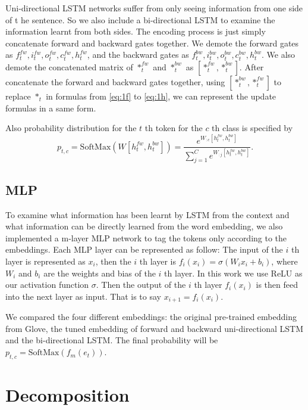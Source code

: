 \documentclass{article}
\begin{document}
Uni-directional LSTM networks suffer from only seeing information from one side of t he sentence. So we also include a bi-directional LSTM to examine the information learnt from both sides. The encoding process is just simply concatenate forward and backward gates together. We demote the forward gates as $f_t^{fw}, i_t^{fw}, o_t^{fw}, c_t^{fw}, h_t^{fw}$, and the backward gates as $f_t^{bw}, i_t^{bw}, o_t^{bw}, c_t^{bw}, h_t^{bw}$. We also demote the concatenated matrix of $*_t^{fw}$ and $*_t^{bw}$ as $[*_t^{fw}, *_t^{bw}]$. After concatenate the forward and backward gates together, using $[*_t^{bw}, *_t^{fw}]$ to replace $*_t$ in formulas from \ref{eq:1f} to \ref{eq:1h}, we can represent the update formulas in a same form. 

Also probability distribution for the $t$ th token for the $c$ th class is specified by 
\begin{equation}
p_{t, c} = \text{SoftMax}(W [h_t^{fw}, h_t^{bw}]) = \frac{e^{W_{:c} [h_t^{fw}, h_t^{bw}]}}{\sum_{j = 1} ^ C e^{W_{:j} [h_t^{fw}, h_t^{bw}]}}.
\end{equation}


\subsection{MLP}

To examine what information has been learnt by LSTM from the context and what information can be directly learned from the word embedding, we also implemented a m-layer MLP network to tag the tokens only according to the embeddings. Each MLP layer can be represented as follow:
The input of the $i$ th layer is represented as $x_i$, then the $i$ th layer is $f_i(x_i) = \sigma(W_i x_i + b_i)$, where $W_i$ and $b_i$ are the weights and bias of the $i$ th layer. In this work we use ReLU as our activation function $\sigma$. Then the output of the $i$ th layer $f_i(x_i)$ is then feed into the next layer as input. That is to say $x_{i+1} = f_i(x_i)$. 

We compared the four different embeddings: the original pre-trained embedding from Glove, the tuned embedding of forward and backward uni-directional LSTM and the bi-directional LSTM. The final probability will be $p_{t, c} = \text{SoftMax}(f_m(e_t))$.%

\section{Decomposition}
\end{document}
